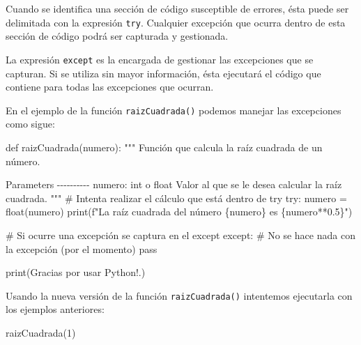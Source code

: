 \documentclass[
  letterpaper,
  DIV=11,
  numbers=noendperiod]{scrreprt}
\newenvironment{Shaded}{\begin{snugshade}}{\end{snugshade}}
\newcommand{\BuiltInTok}[1]{\textcolor[rgb]{0.00,0.23,0.31}{#1}}
\newcommand{\CommentTok}[1]{\textcolor[rgb]{0.37,0.37,0.37}{#1}}
\newcommand{\ControlFlowTok}[1]{\textcolor[rgb]{0.00,0.23,0.31}{#1}}
\newcommand{\DecValTok}[1]{\textcolor[rgb]{0.68,0.00,0.00}{#1}}
\newcommand{\FloatTok}[1]{\textcolor[rgb]{0.68,0.00,0.00}{#1}}
\newcommand{\KeywordTok}[1]{\textcolor[rgb]{0.00,0.23,0.31}{#1}}
\newcommand{\NormalTok}[1]{\textcolor[rgb]{0.00,0.23,0.31}{#1}}
\newcommand{\OperatorTok}[1]{\textcolor[rgb]{0.37,0.37,0.37}{#1}}
\newcommand{\SpecialCharTok}[1]{\textcolor[rgb]{0.37,0.37,0.37}{#1}}
\newcommand{\SpecialStringTok}[1]{\textcolor[rgb]{0.13,0.47,0.30}{#1}}
\newcommand{\StringTok}[1]{\textcolor[rgb]{0.13,0.47,0.30}{#1}}
\begin{document}
Cuando se identifica una sección de código susceptible de errores, ésta
puede ser delimitada con la expresión \texttt{try}. Cualquier excepción
que ocurra dentro de esta sección de código podrá ser capturada y
gestionada.

La expresión \texttt{except} es la encargada de gestionar las
excepciones que se capturan. Si se utiliza sin mayor información, ésta
ejecutará el código que contiene para todas las excepciones que ocurran.

En el ejemplo de la función \texttt{raizCuadrada()} podemos manejar las
excepciones como sigue:

\begin{Shaded}
\begin{Highlighting}[]
\KeywordTok{def}\NormalTok{ raizCuadrada(numero):}
    \CommentTok{"""}
\CommentTok{    Función que calcula la raíz cuadrada de un número.}

\CommentTok{    Parameters}
\CommentTok{    {-}{-}{-}{-}{-}{-}{-}{-}{-}{-}}
\CommentTok{    numero: int o float}
\CommentTok{    Valor al que se le desea calcular la raíz cuadrada.}
\CommentTok{    }
\CommentTok{    """}
    \CommentTok{\# Intenta realizar el cálculo que está dentro de try}
    \ControlFlowTok{try}\NormalTok{:}
\NormalTok{        numero }\OperatorTok{=} \BuiltInTok{float}\NormalTok{(numero)}
        \BuiltInTok{print}\NormalTok{(}\SpecialStringTok{f"La raíz cuadrada del número }\SpecialCharTok{\{}\NormalTok{numero}\SpecialCharTok{\}}\SpecialStringTok{ es }\SpecialCharTok{\{}\NormalTok{numero}\OperatorTok{**}\FloatTok{0.5}\SpecialCharTok{\}}\SpecialStringTok{"}\NormalTok{)}

    \CommentTok{\# Si ocurre una excepción se captura en el except}
    \ControlFlowTok{except}\NormalTok{:}
        \CommentTok{\# No se hace nada con la excepción (por el momento)}
        \ControlFlowTok{pass}

    \BuiltInTok{print}\NormalTok{(}\StringTok{\textquotesingle{}Gracias por usar Python!.\textquotesingle{}}\NormalTok{)}
\end{Highlighting}
\end{Shaded}

Usando la nueva versión de la función \texttt{raizCuadrada()} intentemos
ejecutarla con los ejemplos anteriores:

\begin{Shaded}
\begin{Highlighting}[]
\NormalTok{raizCuadrada(}\DecValTok{1}\NormalTok{)}
\end{Highlighting}
\end{Shaded}
\end{document}
